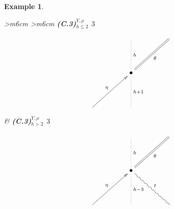 \documentclass[english,letter paper,12pt,leqno]{article}
\theoremstyle{example}
\newtheorem{example}[theorem]{Example}
\numberwithin{equation}{section}
\begin{document}
\begin{example}
\begin{center}
\begin{tabular}{ >{\centering}m{6cm} >{\centering}m{6cm} }
\textbf{(C.3)${}^{Y,\rho}_{h \le 2}$ $3$}
\vspace{0.1cm}
\[
\xymatrix@C+2pc@R+1.5pc{
& \ar@{.}[d]^-{h} & \ar@{=}[dl]^-{\theta} \\
& \bullet \ar@{.}[d]^-{h+1}\\
\ar[ur]^-{\eta} & &
}
\]
&
\textbf{(C.3)${}^{Y,\rho}_{h > 2}$ $3$}
\vspace{0.1cm}
\[
\xymatrix@C+2pc@R+1.5pc{
& \ar@{.}[d]^-{h} & \ar@{=}[dl]^-{\theta} \\
& \bullet \ar@{.}[d]^-{h-3} \ar@{~}[dr]^-{t}\\
\ar[ur]^-{\eta} & &
}
\]
\end{tabular}
\end{center}


\end{example}
\end{document}
